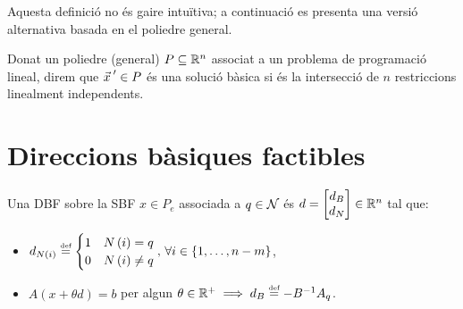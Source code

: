 Aquesta definició no és gaire intuïtiva; a continuació es presenta una versió alternativa basada en el poliedre general.

\begin{defi*}
	Donat un poliedre (general) $P\subseteq\mathbb{R}^n$ associat a un problema de programació lineal, direm que ${\vec{x}_{}\,}'\in P$ és una solució bàsica si és la intersecció de $n$ restriccions linealment independents.
\end{defi*}

\section{Direccions bàsiques factibles}
\begin{defi}
    Una DBF sobre la SBF $x \in P_e$ associada a $q \in \mathcal{N}$ és $d =
    \begin{bmatrix}
        d_B \\
        d_N
    \end{bmatrix}
    \in \mathbb{R}^n$ tal que:
    \begin{itemize}
        \item $d_{N\left(i\right)} \stackrel{\text{\tiny def}}{=}
            \begin{cases}
                1 & N\left(i\right) = q \\
                0 & N\left(i\right) \neq q
            \end{cases}
            ,\, \forall i \in \left\{1, \dots, n-m \right\}$,
        \item $A \left(x + \theta d\right) = b$ per algun $\theta \in \mathbb{R}^+ \implies d_B \stackrel{\text{\tiny def}}{=} -B^{-1} A_q$.
    \end{itemize}
\end{defi}

